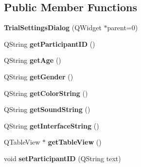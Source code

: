 \subsection*{Public Member Functions}
\begin{DoxyCompactItemize}
\item 
\hypertarget{class_trial_settings_dialog_a211e1dd92ee8e83706840e4830be96b2}{{\bfseries Trial\+Settings\+Dialog} (Q\+Widget $\ast$parent=0)}\label{class_trial_settings_dialog_a211e1dd92ee8e83706840e4830be96b2}

\item 
\hypertarget{class_trial_settings_dialog_a9dc202b2fbba3e224af466c1f1e89ea1}{Q\+String {\bfseries get\+Participant\+I\+D} ()}\label{class_trial_settings_dialog_a9dc202b2fbba3e224af466c1f1e89ea1}

\item 
\hypertarget{class_trial_settings_dialog_adc49a66cceb68c054134a99105eadf8d}{Q\+String {\bfseries get\+Age} ()}\label{class_trial_settings_dialog_adc49a66cceb68c054134a99105eadf8d}

\item 
\hypertarget{class_trial_settings_dialog_aa78d4ef979597bb258d2d1e165852996}{Q\+String {\bfseries get\+Gender} ()}\label{class_trial_settings_dialog_aa78d4ef979597bb258d2d1e165852996}

\item 
\hypertarget{class_trial_settings_dialog_aabc1f6258314e341662deb851aaf9dd6}{Q\+String {\bfseries get\+Color\+String} ()}\label{class_trial_settings_dialog_aabc1f6258314e341662deb851aaf9dd6}

\item 
\hypertarget{class_trial_settings_dialog_ade2ba0bf121c80f29bddadd6446112e4}{Q\+String {\bfseries get\+Sound\+String} ()}\label{class_trial_settings_dialog_ade2ba0bf121c80f29bddadd6446112e4}

\item 
\hypertarget{class_trial_settings_dialog_a3b3c6596fd4585606c546a32f73577fd}{Q\+String {\bfseries get\+Interface\+String} ()}\label{class_trial_settings_dialog_a3b3c6596fd4585606c546a32f73577fd}

\item 
\hypertarget{class_trial_settings_dialog_ae972a64e2b941e48a32c1bae79646e5a}{Q\+Table\+View $\ast$ {\bfseries get\+Table\+View} ()}\label{class_trial_settings_dialog_ae972a64e2b941e48a32c1bae79646e5a}

\item 
\hypertarget{class_trial_settings_dialog_a0d433b07b300b55ecf03ed224f53bb5d}{void {\bfseries set\+Participant\+I\+D} (Q\+String text)}\label{class_trial_settings_dialog_a0d433b07b300b55ecf03ed224f53bb5d}


\end{DoxyCompactItemize}
